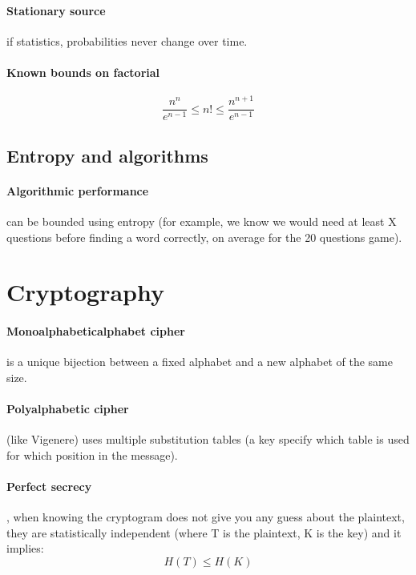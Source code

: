 \documentclass{article}
\begin{document}
\paragraph{Stationary source} if statistics, probabilities never change over time.

\paragraph{Known bounds on factorial}

\[ \frac{n^n}{e^{n-1}} \leq n! \leq \frac{n^{n+1}}{e^{n-1}} \]

\subsection{Entropy and algorithms}

\paragraph{Algorithmic performance} can be bounded using entropy (for example, we know we would need at least X questions before finding a word correctly, on average for the 20 questions game).

\newpage

\section{Cryptography}

\paragraph{Monoalphabeticalphabet cipher} is a unique bijection between a fixed alphabet and a new alphabet of the same size.

\paragraph{Polyalphabetic cipher} (like Vigenere) uses multiple substitution tables (a key specify which table is used for which position in the message).

\paragraph{Perfect secrecy}, when knowing the cryptogram does not give you any guess about the plaintext, they are statistically independent (where T is the plaintext, K is the key) and it implies:
\[ H(T) \leq H(K) \]
\end{document}
